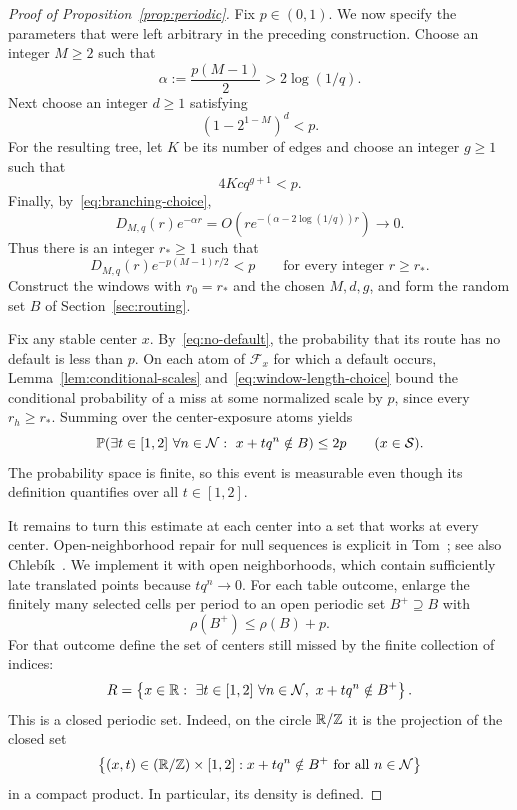\begin{proof}[Proof of Proposition~\ref{prop:periodic}]
Fix $p\in(0,1)$.  We now specify the parameters that were left arbitrary
in the preceding construction.  Choose an integer $M\ge2$ such that
\begin{equation}\label{eq:branching-choice}
 \alpha:=\frac{p(M-1)}2>2\log(1/q).
\end{equation}
Next choose an integer $d\ge1$ satisfying
\[
 (1-2^{1-M})^d<p.
\]
For the resulting tree, let $K$ be its number of edges and choose an
integer $g\ge1$ such that
\[
 4Kc q^{g+1}<p.
\]
Finally, by~\eqref{eq:branching-choice},
\[
 D_{M,q}(r)e^{-\alpha r}
 =O\!\left(r e^{-(\alpha-2\log(1/q))r}\right)
 \longrightarrow0.
\]
Thus there is an integer $r_*\ge1$ such that
\begin{equation}\label{eq:window-length-choice}
 D_{M,q}(r)e^{-p(M-1)r/2}<p
 \qquad\text{for every integer }r\ge r_*.
\end{equation}
Construct the windows with $r_0=r_*$ and the chosen $M,d,g$, and form
the random set $B$ of Section~\ref{sec:routing}.

Fix any stable center $x$.  By~\eqref{eq:no-default}, the probability
that its route has no default is less than $p$.  On each atom of
$\mathcal F_x$ for which a default occurs,
Lemma~\ref{lem:conditional-scales} and~\eqref{eq:window-length-choice}
bound the conditional probability of a miss at some normalized scale
by $p$, since every $r_h\ge r_*$.  Summing over the center-exposure
atoms yields
\begin{equation}\label{eq:stable-miss}
 \mathbb P\!\left(
  \exists t\in[1,2]\ \forall n\in\mathcal N:\
  x+tq^n\notin B
 \right)\le2p
 \qquad(x\in\mathcal S).
\end{equation}
The probability space is finite, so this event is measurable even
though its definition quantifies over all $t\in[1,2]$.

It remains to turn this estimate at each center into a set that works
at every center. Open-neighborhood repair for null sequences is explicit
in Tom~\cite[Lemma~0.2]{Tom2015}; see also
Chleb\'ik~\cite[Section~3, final remark; Proposition~1(vi), (viii)]{Chlebik2015}.
We implement it with open neighborhoods, which contain sufficiently
late translated points because $tq^n\to0$.
For each table outcome, enlarge the finitely many
selected cells per period to an open periodic set $B^+\supseteq B$
with
\[
 \rho(B^+)\le\rho(B)+p.
\]
For that outcome define the set of centers still missed by the finite
collection of indices:
\begin{equation}\label{eq:exceptional-centers}
 R=\left\{x\in\mathbb R:\ \exists t\in[1,2]\ \forall n\in\mathcal N,
                   \ x+tq^n\notin B^+\right\}.
\end{equation}
This is a closed periodic set.  Indeed, on the circle $\mathbb R/\mathbb Z$ it is
the projection of the closed set
\[
 \left\{(x,t)\in(\mathbb R/\mathbb Z)\times[1,2]:
       x+tq^n\notin B^+\ \text{for all }n\in\mathcal N\right\}
\]
in a compact product.  In particular, its density is defined.


\end{proof}
